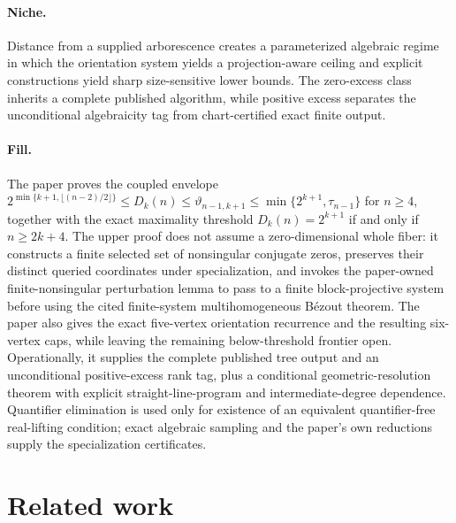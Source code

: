 \documentclass{article}
\begin{document}
\paragraph{Niche.} Distance from a supplied arborescence creates a parameterized algebraic regime in which the orientation system yields a projection-aware ceiling and explicit constructions yield sharp size-sensitive lower bounds. The zero-excess class inherits a complete published algorithm, while positive excess separates the unconditional algebraicity tag from chart-certified exact finite output.

\paragraph{Fill.} The paper proves the coupled envelope \(2^{\min\{k+1,\lfloor(n-2)/2\rfloor\}}\leq D_k(n)\leq\vartheta_{n-1,k+1}\leq\min\{2^{k+1},\tau_{n-1}\}\) for \(n\geq4\), together with the exact maximality threshold \(D_k(n)=2^{k+1}\) if and only if \(n\geq2k+4\). The upper proof does not assume a zero-dimensional whole fiber: it constructs a finite selected set of nonsingular conjugate zeros, preserves their distinct queried coordinates under specialization, and invokes the paper-owned finite-nonsingular perturbation lemma to pass to a finite block-projective system before using the cited finite-system multihomogeneous B\'ezout theorem. The paper also gives the exact five-vertex orientation recurrence and the resulting six-vertex caps, while leaving the remaining below-threshold frontier open. Operationally, it supplies the complete published tree output and an unconditional positive-excess rank tag, plus a conditional geometric-resolution theorem with explicit straight-line-program and intermediate-degree dependence. Quantifier elimination is used only for existence of an equivalent quantifier-free real-lifting condition; exact algebraic sampling and the paper's own reductions supply the specialization certificates.

\section{Related work}
\end{document}

